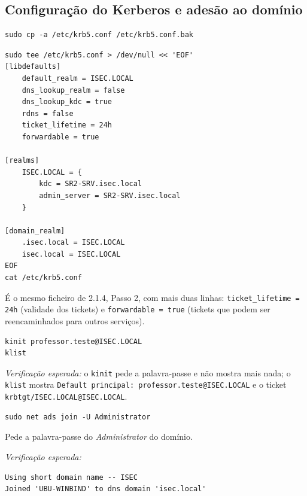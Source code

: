 
\subsection[Configuração do Kerberos e adesão ao domínio]{Configuração do Kerberos e adesão ao domínio}



\begin{lstlisting}[style=bashstyle]
sudo cp -a /etc/krb5.conf /etc/krb5.conf.bak
\end{lstlisting}


\begin{lstlisting}[style=bashstyle]
sudo tee /etc/krb5.conf > /dev/null << 'EOF'
[libdefaults]
    default_realm = ISEC.LOCAL
    dns_lookup_realm = false
    dns_lookup_kdc = true
    rdns = false
    ticket_lifetime = 24h
    forwardable = true

[realms]
    ISEC.LOCAL = {
        kdc = SR2-SRV.isec.local
        admin_server = SR2-SRV.isec.local
    }

[domain_realm]
    .isec.local = ISEC.LOCAL
    isec.local = ISEC.LOCAL
EOF
cat /etc/krb5.conf
\end{lstlisting}

É o mesmo ficheiro de 2.1.4, Passo 2, com mais duas linhas: \texttt{ticket\_lifetime = 24h} (validade dos tickets) e \texttt{forwardable = true} (tickets que podem ser reencaminhados para outros serviços).


\begin{lstlisting}[style=bashstyle]
kinit professor.teste@ISEC.LOCAL
klist
\end{lstlisting}

\emph{Verificação esperada:} o \texttt{kinit} pede a palavra-passe e não mostra mais nada; o \texttt{klist} mostra \texttt{Default principal: professor.teste@ISEC.LOCAL} e o ticket \texttt{krbtgt/\allowbreak{}ISEC.LOCAL@ISEC.LOCAL}.


\begin{lstlisting}[style=bashstyle]
sudo net ads join -U Administrator
\end{lstlisting}

Pede a palavra-passe do \emph{Administrator} do domínio.

\emph{Verificação esperada:}

\begin{lstlisting}[style=cfgstyle]
Using short domain name -- ISEC
Joined 'UBU-WINBIND' to dns domain 'isec.local'
\end{lstlisting}

